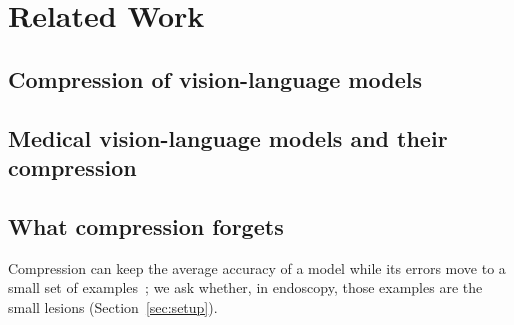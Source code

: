\section{Related Work}
\label{sec:related}


\subsection{Compression of vision-language models}
 \cite{lin_mopeclip,huang_structural_pruning_vlm,cai_llavakd,chen_grace}

\subsection{Medical vision-language models and their compression}
 \cite{khan_compression_medical_mllm,qian_medopd,medtokenbudget}

\subsection{What compression forgets}
Compression can keep the average accuracy of a model while its errors move to a small set of
examples~\cite{hooker_compressed_forget}; we ask whether, in endoscopy, those examples are the
small lesions (Section~\ref{sec:setup}).
 \cite{holste_pruning_longtail,khalid_pruning_longtail,ghostq,kim_quantization_evidence}

